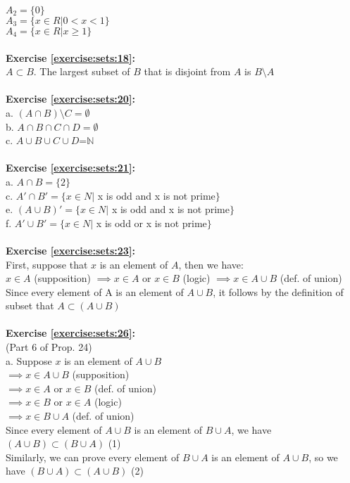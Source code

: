 $A_2=\{0\}$\\
$A_3=\{x\in R|0<x<1\}$\\
$A_4=\{x\in R|x\ge 1\}$\\
\\
\textbf{Exercise \ref{exercise:sets:18}:}\\
$A\subset B$. The largest subset of $B$ that is disjoint from $A$ is $B\setminus A$\\
\\
\textbf{Exercise \ref{exercise:sets:20}:}\\
a. $(A\cap B)\setminus C=\emptyset$\\
b. $A\cap B\cap C\cap D=\emptyset$\\
c. $A \cup B \cup C \cup D$=$\mathbb{N}$\\
\\
\textbf{Exercise \ref{exercise:sets:21}:}\\
a. $A\cap B=\{2\}$\\
c. $A'\cap B'=\{x\in N|$ x is odd and x is not prime$\}$\\
e. $(A\cup B)'=\{x\in N|$ x is odd and x is not prime$\}$\\
f. $A'\cup B'=\{x\in N|$ x is odd or x is not prime$\}$\\
\\
\textbf{Exercise \ref{exercise:sets:23}:}\\
First, suppose that $x$ is an element of $A$, then we have:\\
$x\in A$ (supposition) $\implies x\in A$ or $x\in B$ (logic) $\implies x\in A\cup B$ (def. of union)\\
Since every element of A is an element of $A\cup B$, it follows by the definition of subset that $A\subset (A\cup B)$\\
\\
\textbf{Exercise \ref{exercise:sets:26}:}\\
(Part 6 of Prop. 24)\\
a. Suppose $x$ is an element of $A\cup B$\\
$\implies x\in A\cup B$ (supposition)\\
$\implies x\in A$ or $x\in B$ (def. of union)\\
$\implies x\in B$ or $x\in A$ (logic)\\
$\implies x\in B\cup A$ (def. of union)\\
Since every element of $A\cup B$ is an element of $B\cup A$, we have $(A\cup B)\subset(B\cup A)$ (1)\\
Similarly, we can prove every element of $B\cup A$ is an element of $A\cup B$, so we have $(B\cup A)\subset (A\cup B)$ (2)\\
